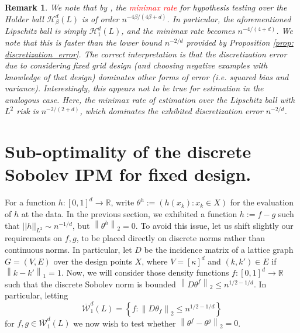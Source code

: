 \documentclass{article}
\newcommand{\Reals}{\mathbb{R}}
\newcommand{\norm}[1]{\left\lVert#1\right\rVert}
\newcommand{\set}[1]{\left\{#1\right\}}
\newcommand{\1}{\mathbb{I}}
\newcommand{\soom}{\sim}
\theoremstyle{alden}
\theoremstyle{aldenthm}
\newtheorem{remark}{Remark}
\theoremstyle{definition}
\theoremstyle{remark}
\begin{document}
\begin{remark}
	We note that by \citep{ariascastro2018}, the \textcolor{red}{minimax rate} for hypothesis testing over the Holder ball $\mathcal{H}_{\beta}^d(L)$ is of order $n^{-4\beta/(4\beta + d)}$. In particular, the aforementioned Lipschitz ball is simply $\mathcal{H}_1^d(L)$, and the minimax rate becomes $n^{-4/(4 + d)}$. We note that this is faster than the lower bound $n^{-2/d}$ provided by Proposition \ref{prop: discretization_error}. The correct interpretation is that the discretization error due to considering fixed grid design (and choosing negative examples with knowledge of that design) dominates other forms of error (i.e. squared bias and variance). Interestingly, this appears not to be true for estimation in the analogous case. Here, the minimax rate of estimation over the Lipschitz ball with $L^2$ risk is $n^{-2/(2 + d)}$, which dominates the exhibited discretization error $n^{-2/d}$. 
\end{remark}

\section{Sub-optimality of the discrete Sobolev IPM for fixed design.}

For a function $h: [0,1]^d \to \Reals$, write $\theta^{h} := (h(x_k): x_k \in X)$ for the evaluation of $h$ at the data. In the previous section, we exhibited a function $h := f - g$ such that $||h||_{L^2} \soom n^{-1/d}$, but $\norm{\theta^{h}}_2 = 0$. To avoid this issue, let us shift slightly our requirements on $f,g$, to be placed directly on discrete norms rather than continuous norms. In particular, let $D$ be the incidence matrix of a lattice graph $G = (V,E)$ over the design points $X$, where $V = [\kappa]^d$ and $(k,k') \in E$ if $\norm{k - k'}_1 = 1$. Now, we will consider those density functions $f: [0,1]^d \to \Reals$ such that the discrete Sobolev norm is bounded $\norm{D\theta^f}_2 \leq n^{1/2 - 1/d}$. In particular, letting
\begin{equation*}
\overline{\mathcal{W}}_{1}^d(L) = \set{f: \norm{D \theta_f}_2 \leq n^{1/2 - 1/d}}
\end{equation*}
for $f, g \in \overline{\mathcal{W}}_{1}^d(L)$ we now wish to test whether $\norm{\theta^f - \theta^g}_2 = 0$. 
\end{document}
